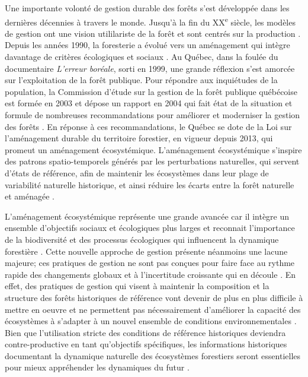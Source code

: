 Une importante volonté de gestion durable des forêts s'est développée
dans les dernières décennies à travers le monde. Jusqu'à la fin du
XX\textsuperscript{e} siècle, les modèles de gestion ont une vision
utililariste de la forêt et sont centrés sur la production
\citep{kuuluvainen_natural_2012}. Depuis les années 1990, la foresterie
a évolué vers un aménagement qui intègre davantage de critères
écologiques et sociaux \citep{messier_managing_2013}. Au Québec, dans la
foulée du documentaire \emph{L'erreur boréale}, sorti en 1999, une
grande réflexion s'est amorcée sur l'exploitation de la forêt publique.
Pour répondre aux inquiétudes de la population, la Commission d'étude
sur la gestion de la forêt publique québécoise est formée en 2003 et
dépose un rapport en 2004 qui fait état de la situation et formule de
nombreuses recommandations pour améliorer et moderniser la gestion des
forêts
\citep{commission_detude_sur_la_gestion_de_la_foret_publique_quebecoise_commission_2004}.
En réponse à ces recommandations, le Québec se dote de la Loi sur
l'aménagement durable du territoire forestier, en vigueur depuis 2013,
qui promeut un aménagement écosystémique. L'aménagement écosystémique
s'inspire des patrons spatio-temporels générés par les perturbations
naturelles, qui servent d'états de référence, afin de maintenir les
écosystèmes dans leur plage de variabilité naturelle historique, et
ainsi réduire les écarts entre la forêt naturelle et aménagée
\citep{vaillancourt_implementation_2009, attiwill_disturbance_1994}.

L'aménagement écosystémique représente une grande avancée car il intègre
un ensemble d'objectifs sociaux et écologiques plus larges et reconnait
l'importance de la biodiversité et des processus écologiques qui
influencent la dynamique forestière
\citep{messier_functional_2019, kuuluvainen_forest_2009}. Cette nouvelle
approche de gestion présente néanmoins une lacune majeure; ces pratiques
de gestion ne sont pas conçues pour faire face au rythme rapide des
changements globaux et à l'incertitude croissante qui en découle
\citep{messier_dealing_2016, millar_climate_2007}. En effet, des
pratiques de gestion qui visent à maintenir la composition et la
structure des forêts historiques de référence vont devenir de plus en
plus difficile à mettre en oeuvre
\citep{duveneck_measuring_2016, boulanger_climate_2019} et ne permettent
pas nécessairement d'améliorer la capacité des écosystèmes à s'adapter à
un nouvel ensemble de conditions environnementales
\citep{seastedt_management_2008}. Bien que l'utilisation stricte des
conditions de référence historiques deviendra contre-productive en tant
qu'objectifs spécifiques, les informations historiques documentant la
dynamique naturelle des écosystèmes forestiers seront essentielles pour
mieux appréhender les dynamiques du futur
\citep{harris_ecological_2006}.

